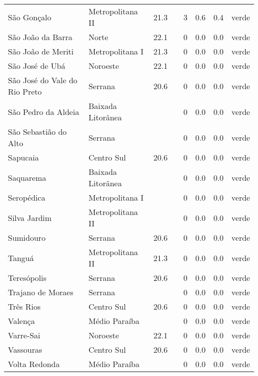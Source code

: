 \begin{longtable}{l|lllllll}
  São Gonçalo & Metropolitana II & 21.3 &  & 3 & 0.6 & 0.4 & verde \\ 
  São João da Barra & Norte & 22.1 &  & 0 & 0.0 & 0.0 & verde \\ 
  São João de Meriti & Metropolitana I & 21.3 &  & 0 & 0.0 & 0.0 & verde \\ 
  São José de Ubá & Noroeste & 22.1 &  & 0 & 0.0 & 0.0 & verde \\ 
  São José do Vale do Rio Preto & Serrana & 20.6 &  & 0 & 0.0 & 0.0 & verde \\ 
  São Pedro da Aldeia & Baixada Litorânea &  &  & 0 & 0.0 & 0.0 & verde \\ 
  São Sebastião do Alto & Serrana &  &  & 0 & 0.0 & 0.0 & verde \\ 
  Sapucaia & Centro Sul & 20.6 &  & 0 & 0.0 & 0.0 & verde \\ 
  Saquarema & Baixada Litorânea &  &  & 0 & 0.0 & 0.0 & verde \\ 
  Seropédica & Metropolitana I &  &  & 0 & 0.0 & 0.0 & verde \\ 
  Silva Jardim & Metropolitana II &  &  & 0 & 0.0 & 0.0 & verde \\ 
  Sumidouro & Serrana & 20.6 &  & 0 & 0.0 & 0.0 & verde \\ 
  Tanguá & Metropolitana II & 21.3 &  & 0 & 0.0 & 0.0 & verde \\ 
  Teresópolis & Serrana & 20.6 &  & 0 & 0.0 & 0.0 & verde \\ 
  Trajano de Moraes & Serrana &  &  & 0 & 0.0 & 0.0 & verde \\ 
  Três Rios & Centro Sul & 20.6 &  & 0 & 0.0 & 0.0 & verde \\ 
  Valença & Médio Paraíba &  &  & 0 & 0.0 & 0.0 & verde \\ 
  Varre-Sai & Noroeste & 22.1 &  & 0 & 0.0 & 0.0 & verde \\ 
  Vassouras & Centro Sul & 20.6 &  & 0 & 0.0 & 0.0 & verde \\ 
  Volta Redonda & Médio Paraíba &  &  & 0 & 0.0 & 0.0 & verde \\ 
  \hline
\end{longtable}
